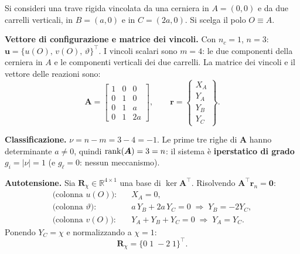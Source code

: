\begin{esempio}
	\label{ex:trave_tre_appoggi}
	Si consideri una trave rigida vincolata da una cerniera in
	$A=(0,0)$ e da due carrelli verticali, in $B=(a,0)$ e in
	$C=(2a,0)$. Si scelga il polo $O\equiv A$.

	
	\begin{svolgimento}
		
		\noindent\textbf{Vettore di configurazione e matrice
			dei vincoli.} Con $n_c=1$, $n=3$:
		$\bm u=\{u(O),\,v(O),\,\vartheta\}^\top$. I vincoli
		scalari sono $m=4$: le due componenti della cerniera in
		$A$ e le componenti verticali dei due carrelli. La
		matrice dei vincoli e il vettore delle reazioni sono:
		\begin{equation*}
			\bm A =
			\begin{bmatrix}
				1 & 0 & 0\\
				0 & 1 & 0\\
				0 & 1 & a\\
				0 & 1 & 2a
			\end{bmatrix},
			\qquad
			\bm r =
			\begin{Bmatrix}
				X_A\\ Y_A\\ Y_B\\ Y_C
			\end{Bmatrix}.
		\end{equation*}
		
		\noindent\textbf{Classificazione.}
		$\nu=n-m=3-4=-1$. Le prime tre righe di $\bm A$ hanno
		determinante $a\neq0$, quindi $\operatorname{rank}(\bm A)=3=n$: il
		sistema è \textbf{iperstatico di grado} $g_i=|\nu|=1$
		(e $g_\ell=0$: nessun meccanismo).
		
		\noindent\textbf{Autotensione.}
		Sia $\bm R_\chi\in\mathbb R^{4\times 1}$ una base di
		$\ker\bm A^\top$. Risolvendo $\bm A^\top\bm r_n=\bm 0$:
		\begin{align*}
			\text{(colonna $u(O)$):}&\quad X_A=0,\\
			\text{(colonna $\vartheta$):}&\quad
			a\,Y_B+2a\,Y_C=0
			\;\Longrightarrow\; Y_B=-2Y_C,\\
			\text{(colonna $v(O)$):}&\quad
			Y_A+Y_B+Y_C=0
			\;\Longrightarrow\; Y_A=Y_C.
		\end{align*}
		Ponendo $Y_C=\chi$ e normalizzando a $\chi=1$:
		\begin{equation*}
			\bm R_\chi = \{0\;1\;-2\;1\}^\top.
		\end{equation*}
		

\end{svolgimento}
\end{esempio}
